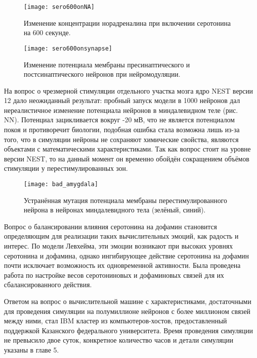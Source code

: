 \begin{figure}
	\centering
	\texttt{[image: sero600onNA]}
	\caption{Изменение концентрации норадреналина при включении серотонина на 600 секунде.}
	\label{fig:sero600onNA}
\end{figure}

\begin{figure}
	\centering
	\texttt{[image: sero600onsynapse]}
	\caption{Изменение потенциала мембраны пресинаптического и постсинаптического нейронов при нейромодуляции.}
	\label{fig:sero600onsynapse}
\end{figure}

На вопрос о чрезмерной стимуляции отдельного участка мозга ядро NEST версии 12 дало неожиданный результат: пробный запуск модели в 1000 нейронов дал нереалистичное изменение потенциала нейронов в миндалевидном теле (рис. NN). Потенциал зацикливается вокруг -20 мВ, что не является потенциалом покоя и противоречит биологии, подобная ошибка стала возможна лишь из-за того, что в симуляции нейроны не сохраняют химические свойства, являются объектами с математическими характеристиками. Так как вопрос стоит на уровне версии NEST, то на данный момент он временно обойдён сокращением объёмов стимуляции у перестимулированных зон.


\begin{figure}
	\centering
	\texttt{[image: bad\_amygdala]}
	\caption{Устранённая мутация потенциала мембраны перестимулированного нейрона в нейронах миндалевидного тела (зелёный, синий).}
	\label{fig:bad_amygdala}
\end{figure}

Вопрос о балансировании влияния серотонина на дофамин становится определяющим для реализации таких вычислительных эмоций, как радость и интерес. По модели Левхейма, эти эмоции возникают при высоких уровнях серотонина и дофамина, однако ингибирующее действие серотонина на дофамин почти исключает возможность их одновременной активности. Была проведена работа по настройке весов серотониновых и дофаминовых связей для их сбалансированного действия.


Ответом на вопрос о вычислительной машине с характеристиками, достаточными для проведения симуляции на полумиллионе нейронов с более миллионом связей между ними, стал IBM кластер из компьютеров-хостов, предоставленный поддержкой Казанского федерального университета. Время проведения симуляции не превысило двое суток, конкретное количество часов и детали симуляции указаны в главе 5.